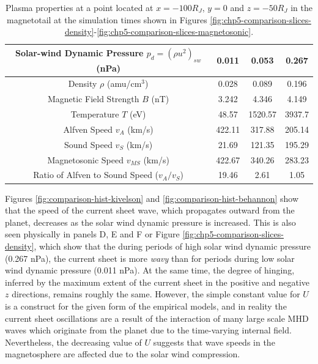 \begin{table}
    \centering
    \begin{tabular}{c|c|c|c}
    Solar-wind Dynamic Pressure $p_d=(\rho u^2)_{sw}$ (nPa)   &\textbf{0.011}  &\textbf{0.053}    &\textbf{0.267} \\
    \hline
    Density $\rho$ (amu/cm$^3$)     &0.028       &0.089       &0.196\\
    Magnetic Field Strength $B$ (nT)                &3.242       &4.346       &4.149\\
    Temperature $T$ (eV)                &48.57       &1520.57     &3937.7\\
    Alfven Speed $v_A$ (km/s)            &422.11      &317.88      &205.14\\
    Sound Speed $v_S$ (km/s)            &21.69       &121.35      &195.29\\
    Magnetosonic Speed $v_{MS}$ (km/s)         &422.67      &340.26      &283.23\\
    Ratio of Alfven to Sound Speed ($v_A/v_S$)               &19.46       &2.61        &1.05
    \end{tabular}
    \caption{Plasma properties at a point located at $x=-100 R_J$, $y=0$ and $z=-50 R_J$ in the magnetotail at the simulation times shown in Figures \protect\ref{fig:chp5-comparison-slices-density}-\ref{fig:chp5-comparison-slices-magnetosonic}.}
    \label{tab:plasma-properties-chp6lobes}
\end{table}

Figures \ref{fig:comparison-hist-kivelson} and \ref{fig:comparison-hist-behannon} show that the speed of the current sheet wave, which propagates outward from the planet, decreases as the solar wind dynamic pressure is increased. This is also seen physically in panels D, E and F or Figure \ref{fig:chp5-comparison-slices-density}, which show that the during periods of high solar wind dynamic pressure (0.267 nPa), the current sheet is more \emph{wavy} than for periods during low solar wind dynamic pressure (0.011 nPa). At the same time, the degree of hinging, inferred by the maximum extent of the current sheet in the positive and negative $z$ directions, remains roughly the same. However, the simple constant value for $U$ is a construct for the given form of the empirical models, and in reality the current sheet oscillations are a result of the interaction of many large scale MHD waves which originate from the planet due to the time-varying internal field. Nevertheless, the decreasing value of $U$ suggests that wave speeds in the magnetosphere are affected due to the solar wind compression. 

